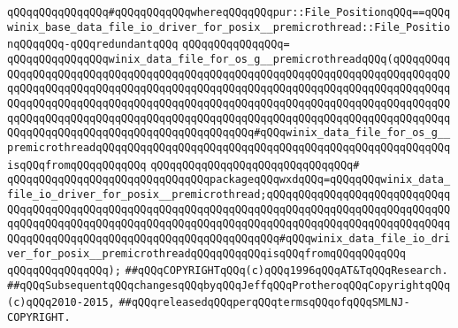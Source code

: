 \verb|qQQqqQQqqQQqqQQq#qQQqqQQqqQQqwhereqQQqqQQqpur::File_PositionqQQq==qQQqwinix_base_data_file_io_driver_for_posix__premicrothread::File_PositionqQQqqQQq-qQQqredundantqQQq|\newline
\verb|qQQqqQQqqQQqqQQq=|\newline
\verb|qQQqqQQqqQQqqQQqwinix_data_file_for_os_g__premicrothreadqQQq(qQQqqQQqqQQqqQQqqQQqqQQqqQQqqQQqqQQqqQQqqQQqqQQqqQQqqQQqqQQqqQQqqQQqqQQqqQQqqQQqqQQqqQQqqQQqqQQqqQQqqQQqqQQqqQQqqQQqqQQqqQQqqQQqqQQqqQQqqQQqqQQqqQQqqQQqqQQqqQQqqQQqqQQqqQQqqQQqqQQqqQQqqQQqqQQqqQQqqQQqqQQqqQQqqQQqqQQqqQQqqQQqqQQqqQQqqQQqqQQqqQQqqQQqqQQqqQQqqQQqqQQqqQQqqQQqqQQqqQQqqQQqqQQqqQQqqQQqqQQqqQQqqQQqqQQqqQQqqQQqqQQqqQQq#qQQqwinix_data_file_for_os_g__premicrothreadqQQqqQQqqQQqqQQqqQQqqQQqqQQqqQQqqQQqqQQqqQQqqQQqqQQqqQQqisqQQqfromqQQqqQQqqQQq|\newline
\verb|qQQqqQQqqQQqqQQqqQQqqQQqqQQqqQQq#|\newline
\verb|qQQqqQQqqQQqqQQqqQQqqQQqqQQqqQQqpackageqQQqwxdqQQq=qQQqqQQqwinix_data_file_io_driver_for_posix__premicrothread;qQQqqQQqqQQqqQQqqQQqqQQqqQQqqQQqqQQqqQQqqQQqqQQqqQQqqQQqqQQqqQQqqQQqqQQqqQQqqQQqqQQqqQQqqQQqqQQqqQQqqQQqqQQqqQQqqQQqqQQqqQQqqQQqqQQqqQQqqQQqqQQqqQQqqQQqqQQqqQQqqQQqqQQqqQQqqQQqqQQqqQQqqQQqqQQqqQQqqQQqqQQqqQQqqQQq#qQQqwinix_data_file_io_driver_for_posix__premicrothreadqQQqqQQqqQQqisqQQqfromqQQqqQQqqQQq|\newline
\verb|qQQqqQQqqQQqqQQq);|\newline
\newline
\newline
\newline
\newline
\verb|##qQQqCOPYRIGHTqQQq(c)qQQq1996qQQqAT&TqQQqResearch.|\newline
\verb|##qQQqSubsequentqQQqchangesqQQqbyqQQqJeffqQQqProtheroqQQqCopyrightqQQq(c)qQQq2010-2015,|\newline
\verb|##qQQqreleasedqQQqperqQQqtermsqQQqofqQQqSMLNJ-COPYRIGHT.|\newline


